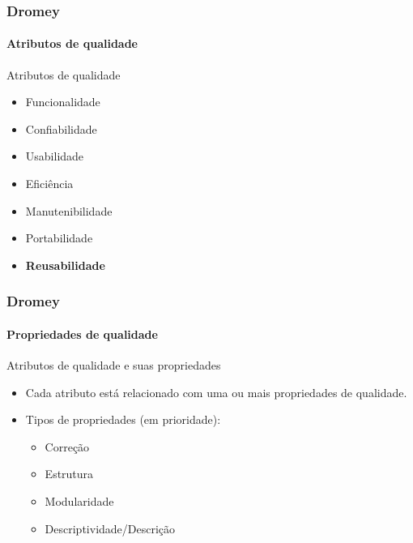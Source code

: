 \begin{frame}
	\frametitle{Dromey}
	\framesubtitle{Atributos de qualidade}
	
	\begin{block:fact}{Atributos de qualidade}
		\begin{itemize}
			\item Funcionalidade
			\item Confiabilidade
			\item Usabilidade
			\item Eficiência
			\item Manutenibilidade
			\item Portabilidade
			\item \textbf{Reusabilidade}
		\end{itemize}
	\end{block:fact}
	
\end{frame}


\begin{frame}
	\frametitle{Dromey}
	\framesubtitle{Propriedades de qualidade}
	
	\begin{block:fact}{Atributos de qualidade e suas propriedades}
		\begin{itemize}
			\item Cada atributo está relacionado com uma ou mais propriedades de qualidade.
			
			\item Tipos de propriedades (em prioridade):
			\begin{itemize}
				\item Correção
				\item Estrutura
				\item Modularidade
				\item Descriptividade/Descrição
			\end{itemize}
		\end{itemize}
	\end{block:fact}

\end{frame}


